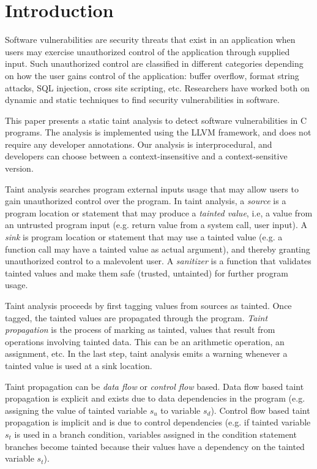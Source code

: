 \section{Introduction}
Software vulnerabilities are security threats
that exist in an application when users may exercise
unauthorized  control of the application through supplied input.
Such unauthorized control are classified in different
categories depending on how the user gains control of
the application: buffer overflow, format string attacks,
SQL injection, cross site scripting, etc.
Researchers have worked both on dynamic \cite{Clause:2007:Dytan,
Kiezun:2009:Ardilla} and static techniques 
\cite{Jovanovic:2006:Pixy, Shankar:2001:DFS, livshits05finding, 
Avots:2005:ISS, Dimitru:2009:STAC, Tripp:2009:TET} to find 
security vulnerabilities in software. 

This paper presents a static taint analysis to detect software
vulnerabilities in C programs. The analysis is implemented
using the LLVM framework\cite{Lattner:2004:LLVM}, and does
not require any developer annotations. Our analysis
is interprocedural, and developers can choose between a
context-insensitive and a context-sensitive version. 

Taint analysis searches program external inputs usage that
may allow users to gain unauthorized control over the program. 
In taint analysis, a \textit{source} is a program location
or statement that may produce a \textit{tainted value}, i.e,
a value from an untrusted program input (e.g. return value from a
system call, user input). 
A \textit{sink} is program location or statement that may use
a tainted value (e.g. a function call may have a tainted value as
actual argument), and thereby granting unauthorized control
to a malevolent user.
A \textit{sanitizer} is a function that validates tainted
values and make them safe (trusted, untainted) for further
program usage.

Taint analysis proceeds by first tagging values from sources
as tainted. Once tagged, the tainted values are propagated
through the program.
\textit{Taint propagation} is the process of marking as tainted, 
values that result from operations involving tainted data. This
can be an arithmetic operation, an assignment, etc. In the
last step, taint analysis emits a warning whenever a tainted
value is used at a sink location.

Taint propagation can be \textit{data flow} or \textit{control flow}
based. Data flow based taint propagation is explicit and exists
due to data dependencies in the program (e.g. assigning the value
of tainted variable $s_u$ to variable $s_d$).
Control flow based taint propagation is implicit and is due to
control dependencies (e.g. if tainted variable $s_t$ is used in a branch
condition, variables assigned in the condition statement branches
become tainted because their values have a dependency on the
tainted variable $s_t$).


